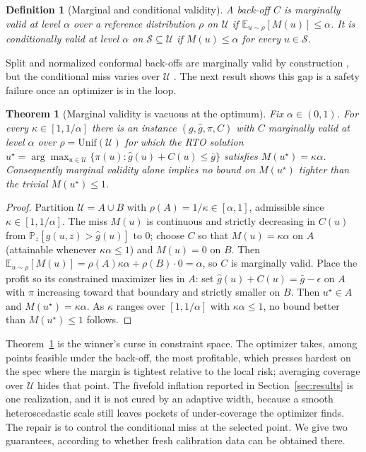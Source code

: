\documentclass[journal]{IEEEtran}
\newtheorem{theorem}{Theorem}
\newtheorem{definition}{Definition}
\begin{document}
\begin{definition}[Marginal and conditional validity]
A back-off $C$ is \emph{marginally valid} at level $\alpha$ over a reference distribution $\rho$
on $\mathcal U$ if $\mathbb E_{u\sim\rho}[M(u)]\le\alpha$. It is \emph{conditionally valid} at
level $\alpha$ on $\mathcal S\subseteq\mathcal U$ if $M(u)\le\alpha$ for every $u\in\mathcal S$.
\end{definition}

Split and normalized conformal back-offs are marginally valid by construction
\cite{vovk2005,lei2018}, but the conditional miss varies over $\mathcal U$
\cite{gibbscherian2023}. The next result shows this gap is a safety failure once an optimizer is
in the loop.

\begin{theorem}[Marginal validity is vacuous at the optimum]
\label{thm:vacuous}
Fix $\alpha\in(0,1)$. For every $\kappa\in[1,1/\alpha]$ there is an instance $(g,\hat g,\pi,C)$
with $C$ marginally valid at level $\alpha$ over $\rho=\mathrm{Unif}(\mathcal U)$ for which the RTO
solution $u^\star=\arg\max_{u\in\mathcal U}\{\pi(u):\hat g(u)+C(u)\le\bar g\}$ satisfies
$M(u^\star)=\kappa\alpha$. Consequently marginal validity alone implies no bound on $M(u^\star)$
tighter than the trivial $M(u^\star)\le1$.
\end{theorem}

\begin{proof}
Partition $\mathcal U=A\cup B$ with $\rho(A)=1/\kappa\in[\alpha,1]$, admissible since
$\kappa\in[1,1/\alpha]$. The miss $M(u)$ is continuous and strictly decreasing in $C(u)$ from
$\mathbb P_z[g(u,z)>\hat g(u)]$ to $0$; choose $C$ so that $M(u)=\kappa\alpha$ on $A$ (attainable
whenever $\kappa\alpha\le1$) and $M(u)=0$ on $B$. Then
$\mathbb E_{u\sim\rho}[M(u)]=\rho(A)\kappa\alpha+\rho(B)\cdot0=\alpha$, so $C$ is marginally valid.
Place the profit so its constrained maximizer lies in $A$: set $\hat g(u)+C(u)=\bar g-\epsilon$ on
$A$ with $\pi$ increasing toward that boundary and strictly smaller on $B$. Then $u^\star\in A$ and
$M(u^\star)=\kappa\alpha$. As $\kappa$ ranges over $[1,1/\alpha]$ with $\kappa\alpha\le1$, no bound
better than $M(u^\star)\le1$ follows.
\end{proof}

Theorem~\ref{thm:vacuous} is the winner's curse in constraint space. The optimizer takes, among
points feasible under the back-off, the most profitable, which presses hardest on the spec where
the margin is tightest relative to the local risk; averaging coverage over $\mathcal U$ hides that
point. The fivefold inflation reported in Section~\ref{sec:results} is one realization, and it is
not cured by an adaptive width, because a smooth heteroscedastic scale still leaves pockets of
under-coverage the optimizer finds. The repair is to control the conditional miss at the selected
point. We give two guarantees, according to whether fresh calibration data can be obtained there.
\end{document}
